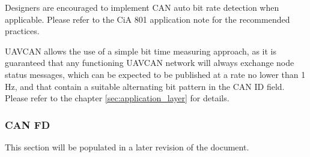 Designers are encouraged to implement CAN auto bit rate detection when applicable.
Please refer to the CiA 801 application note for the recommended practices.

UAVCAN allows the use of a simple bit time measuring approach,
as it is guaranteed that any functioning UAVCAN network will always exchange node status messages,
which can be expected to be published at a rate no lower than 1 Hz,
and that contain a suitable alternating bit pattern in the CAN ID field.
Please refer to the chapter \ref{sec:application_layer} for details.

\subsubsection{CAN FD}

This section will be populated in a later revision of the document.
